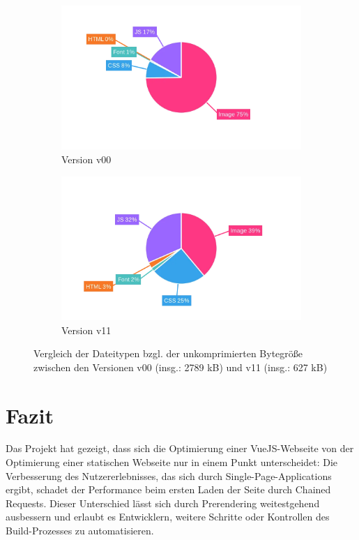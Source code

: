 \documentclass[11pt,a4paper]{article}
\begin{document}
\begin{figure}[h]
  \begin{subfigure}{.5\textwidth}
    \centering
    \includegraphics[width=.8\linewidth]{images/v00_content.png}
    \caption{Version v00}
    \label{fig:v00content}
  \end{subfigure}%
  \begin{subfigure}{.5\textwidth}
    \centering
    \includegraphics[width=.8\linewidth]{images/v11_content.png}
    \caption{Version v11}
    \label{fig:v11content}
  \end{subfigure}
  \caption{Vergleich der Dateitypen bzgl. der unkomprimierten Bytegröße zwischen den Versionen v00 (insg.: 2789 kB) und v11 (insg.: 627 kB)}
  \label{fig:content}
\end{figure}

\section{Fazit}
Das Projekt hat gezeigt, dass sich die Optimierung einer VueJS-Webseite von der Optimierung einer statischen Webseite nur in einem Punkt unterscheidet: Die Verbesserung des Nutzererlebnisses, das sich durch Single-Page-Applications ergibt, schadet der Performance beim ersten Laden der Seite durch Chained Requests.
Dieser Unterschied lässt sich durch Prerendering weitestgehend ausbessern und erlaubt es Entwicklern, weitere Schritte oder Kontrollen des Build-Prozesses zu automatisieren.
\end{document}
